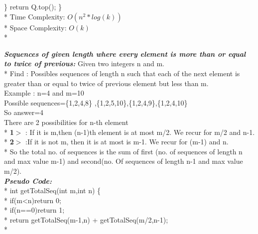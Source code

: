 \documentclass[12pt]{book}
\begin{document}
    
\phantom{x} \hspace{3ex}    \}
\phantom{x} \hspace{3ex} return Q.top();   
\} \\*
\newline
Time Complexity:
$O(n^2 * log(k))$ \\*
Space Complexity:
$O(k)$ \\*

\textbf{\textit{Sequences of given length where every element is more than or equal to twice of previous:}}
Given two integers n and m. \\*
Find : Possibles sequences of length n such that each of the next element is greater than or equal to twice of previous element but less than m. \\
\newline
Example : n=4 and m=10 \\
\newline
Possible sequences=\{1,2,4,8\} ,\{1,2,5,10\},\{1,2,4,9\},\{1,2,4,10\} \\
\newline
So answer=4\\
\newline
There are 2 possibilities for n-th element \\*
\textbf{1$>$} : If it is m,then (n-1)th element is at most m/2. We recur for m/2 and n-1. \\*
\textbf{2$>$} :If it is not m, then it is at most is m-1. We recur for (m-1) and n.\\*
So the total no. of sequences is the sum of first (no. of sequences of length n and max value m-1) and second(no. Of sequences of length n-1 and max value m/2).\\
\newline
\newline
\textbf{\textit{Pseudo Code:}} \\*
int getTotalSeq(int m,int n)
\{ \\*
    if(m<n)return 0;\\*
    if(n==0)return 1;\\*
    return getTotalSeq(m-1,n) + getTotalSeq(m/2,n-1);\\*
\end{document}
